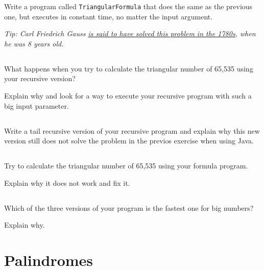 \documentclass[a4paper, 11pt]{article}
\begin{document}
Write a program called \texttt{TriangularFormula} that does the same as the
previous one, but executes in constant time, no matter the input argument.

\textsl{Tip: Carl Friedrich Gauss
\href{http://www.americanscientist.org/issues/pub/gausss-day-of-reckoning/1}{is
said to have solved this problem in the 1780s}, when he was 8 years old.}


\subsection{}

What happens when you try to calculate the triangular number of 65,535 using
your recursive version?

Explain why and look for a way to execute your recursive program with such a
big input parameter.

\subsection{}

Write a tail recursive version of your recursive program and explain why this
new version still does not solve the problem in the previos exercise when using
Java.


\subsection{}

Try to calculate the triangular number of 65,535 using your formula program.

Explain why it does not work and fix it.


\subsection{}

Which of the three versions of your program is the fastest one for big numbers?

Explain why.

\section{Palindromes}

\subsection{}
\end{document}
